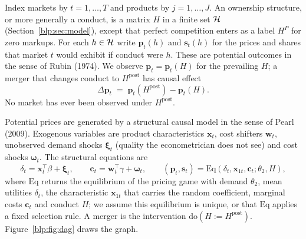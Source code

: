 Index markets by $t=1,\dots,T$ and products by $j=1,\dots,J$. An ownership structure, or more
generally a conduct, is a matrix $H$ in a finite set $\mathcal{H}$ (Section~\ref{blp:sec:model}), except that perfect competition enters as a label $H^P$ for zero markups. For each $h\in\mathcal{H}$ write $\bm p_t(h)$ and $\bm s_t(h)$ for the prices
and shares that market $t$ would exhibit if conduct were $h$. These are potential outcomes in the
sense of Rubin (1974). We observe $\bm p_t = \bm p_t(H)$ for the prevailing $H$; a merger that changes conduct to $H^{\mathrm{post}}$ has causal effect
\[
\Delta\bm p_t \;=\; \bm p_t(H^{\mathrm{post}}) - \bm p_t(H).
\]
No market has ever been observed under $H^{\mathrm{post}}$.

Potential prices are generated by a structural causal model in the sense of Pearl (2009). Exogenous variables are product characteristics $\bm x_t$, cost shifters $\bm w_t$, unobserved
demand shocks $\bm\xi_t$ (quality the econometrician does not see) and cost shocks $\bm\omega_t$.
The structural equations are
\begin{equation}\label{blp:eq:scm}
\delta_t = \bm x_t^\top\beta + \bm\xi_t,\qquad
\bm c_t = \bm w_t^\top\gamma + \bm\omega_t,\qquad
(\bm p_t,\bm s_t) = \mathrm{Eq}(\delta_t,\bm x_{1t},\bm c_t;\theta_2,H),
\end{equation}
where $\mathrm{Eq}$ returns the equilibrium of the pricing game with demand $\theta_2$, mean
utilities $\delta_t$, the characteristic $\bm x_{1t}$ that carries the random coefficient, marginal costs $\bm c_t$ and conduct $H$; we assume this equilibrium is unique, or that $\mathrm{Eq}$ applies a fixed selection rule. A merger is the intervention
$\mathrm{do}(H := H^{\mathrm{post}})$. Figure~\ref{blp:fig:dag} draws the graph.


